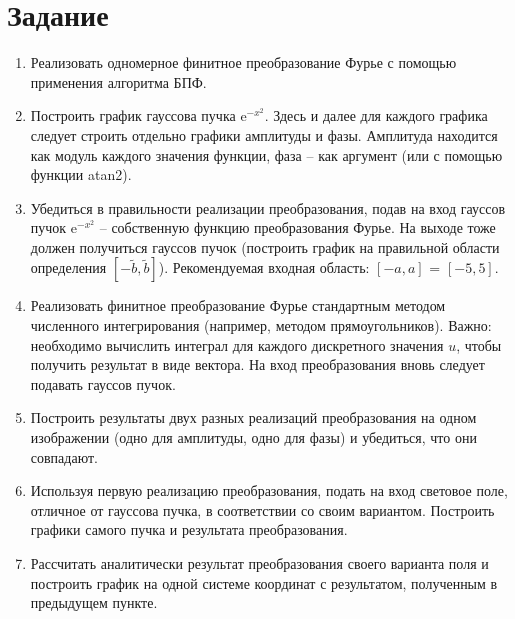 
\setcounter{page}{2}



\section*{Задание}
{
	\begin{enumerate}
	    \item Реализовать одномерное финитное преобразование Фурье с помощью
применения алгоритма БПФ.

	\item Построить график гауссова пучка $\mathrm{e}^{-x^2}$. Здесь и далее для каждого графика следует строить отдельно графики амплитуды и фазы. Амплитуда находится как модуль каждого значения функции, фаза -- как аргумент (или с помощью функции atan2).

	\item Убедиться в правильности реализации преобразования, подав на вход гауссов пучок $\mathrm{e}^{-x^2}$ -- собственную функцию преобразования Фурье. На выходе тоже должен получиться гауссов пучок (построить график на правильной области определения $[-\tilde{b}, \tilde{b}]$). Рекомендуемая входная область: $[−a, a]$ = $[−5, 5]$.

	\item Реализовать финитное преобразование Фурье стандартным методом численного интегрирования (например, методом прямоугольников). Важно: необходимо вычислить интеграл для каждого дискретного значения $u$, чтобы получить результат в виде вектора. На вход преобразования вновь следует подавать гауссов пучок.

	\item Построить результаты двух разных реализаций преобразования на одном изображении (одно для амплитуды, одно для фазы) и убедиться, что они совпадают.
	
	\item Используя первую реализацию преобразования, подать на вход световое поле, отличное от гауссова пучка, в соответствии со своим вариантом. Построить графики самого пучка и результата преобразования.
	
	\item Рассчитать аналитически результат преобразования своего варианта поля и построить график на одной системе координат с результатом, полученным в предыдущем пункте.
	\end{enumerate}
}
\newpage


